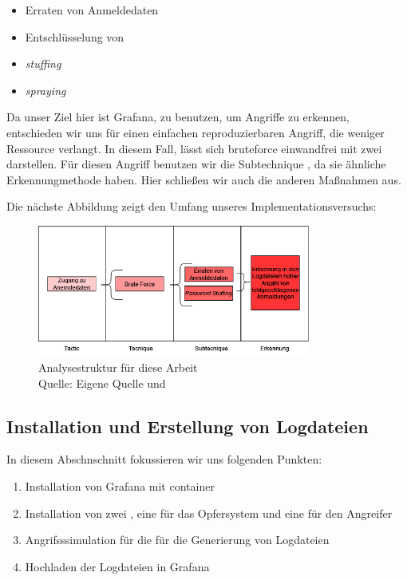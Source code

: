 \begin{itemize}[noitemsep]
   \item Erraten von Anmeldedaten 
   \item	Entschlüsselung von 
   \item \textit{\gls{stuffing}}
   \item \textit{\gls{spraying}}

\end{itemize}

Da unser Ziel hier ist Grafana, zu benutzen, um Angriffe zu erkennen, entschieden wir uns für einen einfachen reproduzierbaren Angriff, die weniger Ressource verlangt. In diesem Fall, lässt sich \gls{bruteforce} einwandfrei mit zwei  darstellen. Für diesen Angriff benutzen wir die Subtechnique , da sie ähnliche Erkennungmethode haben. Hier schließen wir auch die anderen Maßnahmen aus.

Die nächste Abbildung zeigt den Umfang unseres Implementationsversuchs:

\begin{figure}[H]
   \centering
   \includegraphics[width=0.8\textwidth]{assets/T1110.drawio.png}
   \caption{Analysestruktur für diese Arbeit  \\Quelle: Eigene Quelle und \citep{Mitre_t1110}}
   \centering
\end{figure}

\subsection{Installation und Erstellung von Logdateien}

In diesem Abschnschnitt fokussieren wir uns folgenden Punkten:

\begin{enumerate}[noitemsep]
   \item Installation von Grafana mit \gls{container}
   \item	Installation von zwei , eine für das Opfersystem und eine für den Angreifer
   \item	Angrifsssimulation für die für die Generierung von Logdateien
   \item Hochladen der Logdateien in Grafana
\end{enumerate}


